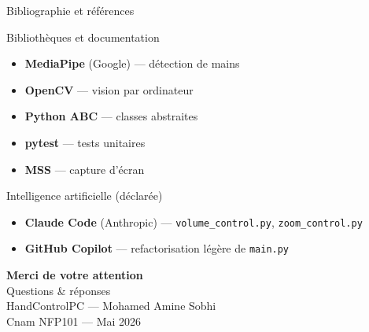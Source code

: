\documentclass[aspectratio=169,12pt]{beamer}
\begin{document}
\begin{frame}{Bibliographie et r\'ef\'erences}
  \begin{block}{Biblioth\`eques et documentation}
    \begin{itemize}
      \item \textbf{MediaPipe} (Google) --- d\'etection de mains
      \item \textbf{OpenCV} --- vision par ordinateur
      \item \textbf{Python ABC} --- classes abstraites
      \item \textbf{pytest} --- tests unitaires
      \item \textbf{MSS} --- capture d'\'ecran
    \end{itemize}
  \end{block}
  \begin{block}{Intelligence artificielle (d\'eclar\'ee)}
    \begin{itemize}
      \item \textbf{Claude Code} (Anthropic) --- \texttt{volume\_control.py}, \texttt{zoom\_control.py}
      \item \textbf{GitHub Copilot} --- refactorisation l\'eg\`ere de \texttt{main.py}
    \end{itemize}
  \end{block}
\end{frame}

\begin{frame}[plain]
  \begin{center}
    \vfill
    {\Huge \textbf{\textcolor{cnamblue}{Merci de votre attention}}}\\[0.6cm]
    {\Large Questions \& r\'eponses}\\[1cm]
    {\large HandControlPC --- Mohamed Amine Sobhi}\\[0.2cm]
    {\normalsize Cnam NFP101 --- Mai 2026}
    \vfill
  \end{center}
\end{frame}
\end{document}
